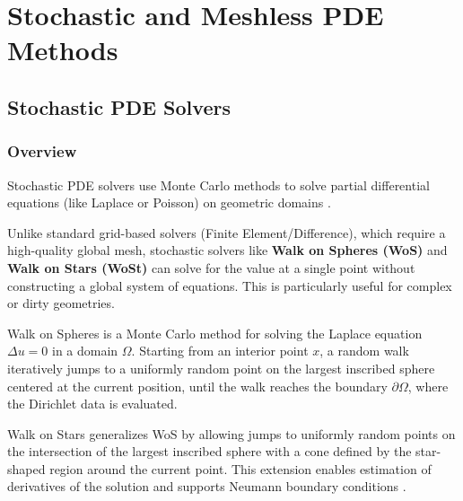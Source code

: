 \chapter{Stochastic and Meshless PDE Methods}
\label{ch:stochastic_pde}

\section{Stochastic PDE Solvers}
\label{sec:stochastic_pde}

\subsection{Overview}
Stochastic PDE solvers use Monte Carlo methods to solve partial differential equations (like Laplace or Poisson) on geometric domains \cite{sawhney2020}.

Unlike standard grid-based solvers (Finite Element/Difference), which require a high-quality global mesh, stochastic solvers like \textbf{Walk on Spheres (WoS)} and \textbf{Walk on Stars (WoSt)} can solve for the value at a single point without constructing a global system of equations. This is particularly useful for complex or dirty geometries.

\begin{definition}\label{def:wos}
Walk on Spheres is a Monte Carlo method for solving the Laplace equation $\Delta u = 0$ in a domain $\Omega$. Starting from an interior point $x$, a random walk iteratively jumps to a uniformly random point on the largest inscribed sphere centered at the current position, until the walk reaches the boundary $\partial\Omega$, where the Dirichlet data is evaluated.
\end{definition}

\begin{definition}\label{def:wost}
Walk on Stars generalizes WoS by allowing jumps to uniformly random points on the intersection of the largest inscribed sphere with a cone defined by the star-shaped region around the current point. This extension enables estimation of derivatives of the solution and supports Neumann boundary conditions \cite{yu2025}.
\end{definition}

